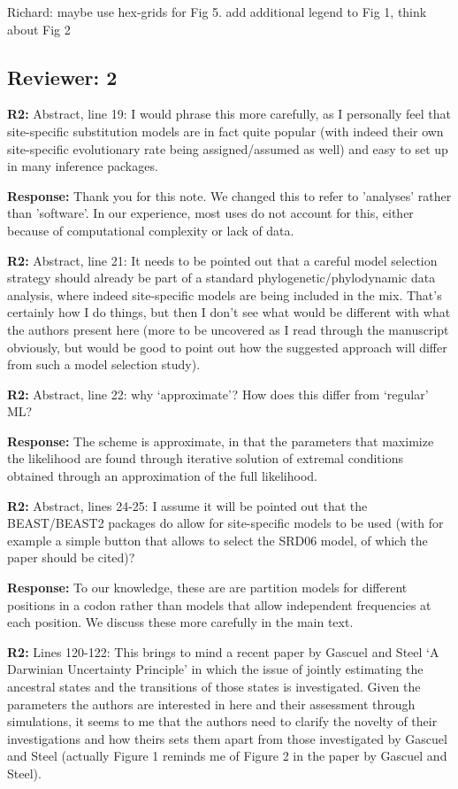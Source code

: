 \documentclass[aps,rmp,onecolumn]{revtex4-1}
\newcommand{\Richard}[1]{{\color{drab}Richard: #1}}
\newcommand{\refb}[1]{\textbf{R2:} #1}
\newcommand{\response}[1]{{\color{black}\textbf{Response:} #1}}
\begin{document}
\Richard{maybe use hex-grids for Fig 5. add additional legend to Fig 1, think about Fig 2 }


\subsection*{Reviewer: 2}


\refb{Abstract, line 19: I would phrase this more carefully, as I personally feel that site-specific substitution models are in fact quite popular (with indeed their own site-specific evolutionary rate being assigned/assumed as well) and easy to set up in many inference packages.}

\response{Thank you for this note. We changed this to refer to 'analyses' rather than 'software'. In our experience, most uses do not account for this, either because of computational complexity or lack of data. }

\refb{Abstract, line 21: It needs to be pointed out that a careful model selection strategy should already be part of a standard phylogenetic/phylodynamic data analysis, where indeed site-specific models are being included in the mix. That’s certainly how I do things, but then I don’t see what would be different with what the authors present here (more to be uncovered as I read through the manuscript obviously, but would be good to point out how the suggested approach will differ from such a model selection study).}

\refb{Abstract, line 22: why ‘approximate’? How does this differ from ‘regular’ ML?}

\response{The scheme is approximate, in that the parameters that maximize the likelihood are found through iterative solution of extremal conditions obtained through an approximation of the full likelihood. }

\refb{Abstract, lines 24-25: I assume it will be pointed out that the BEAST/BEAST2 packages do allow for site-specific models to be used (with for example a simple button that allows to select the SRD06 model, of which the paper should be cited)?}

\response{To our knowledge, these are are partition models for different positions in a codon rather than models that allow independent frequencies at each position. We discuss these more carefully in the main text.}


\refb{Lines 120-122: This brings to mind a recent paper by Gascuel and Steel ‘A Darwinian Uncertainty Principle’ in which the issue of jointly estimating the ancestral states and the transitions of those states is investigated. Given the parameters the authors are interested in here and their assessment through simulations, it seems to me that the authors need to clarify the novelty of their investigations and how theirs sets them apart from those investigated by Gascuel and Steel (actually Figure 1 reminds me of Figure 2 in the paper by Gascuel and Steel).}
\end{document}
